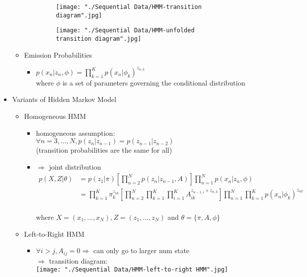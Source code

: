 \begin{itemize}
\begin{itemize}
\begin{itemize}
\begin{figure}[h]
			\centering
			\begin{minipage}{.5\textwidth}
				\texttt{[image: "./Sequential Data/HMM-transition diagram".jpg]}
			\end{minipage}%
			\begin{minipage}{.5\textwidth}
				\texttt{[image: "./Sequential Data/HMM-unfolded transition diagram".jpg]}
			\end{minipage}
		\end{figure}
		\end{itemize}
	\item Emission Probabilities
		\begin{itemize}
		\item $\displaystyle p(x_n|z_n,\phi) = \prod_{k=1}^K p(x_n|\phi_k)^{z_{n,k}}$ \\
		where $\phi$ is a set of parameters governing the conditional distribution
		\end{itemize}
	\end{itemize}
\item Variants of Hidden Markov Model
	\begin{itemize}
	\item Homogeneous HMM
		\begin{itemize}
		\item homogeneous assumption: $\forall n=3,...,N, p(z_n|z_{n-1}) = p(z_{n-1}|z_{n-2})$ \\
		(transition probabilities are the same for all)
		\item $\Rightarrow$ joint distribution \begin{align*} \displaystyle p(X,Z|\theta) &= p(z_1|\pi) \left[\prod_{n=2}^N p(z_n|z_{n-1},A)\right] \prod_{n=1}^N p(x_n|z_n,\phi) \\ &= \prod_{k=1}^K \pi_k^{z_{1k}} \left[ \prod_{n=2}^N  \prod_{k=1}^K \prod_{i=1}^K A_{ik}^{z_{n-1,i} \times z_{n,k}} \right] \prod_{n=1}^N \prod_{k=1}^Kp(x_n|\phi_k)^{z_{nk}}\end{align*} \\
		where $X = (x_1,...,x_N), Z=(z_1,...,z_N)$ and $\theta = \{\pi,A,\phi\}$
		\end{itemize}
	\item Left-to-Right HMM
		\begin{itemize}
		\item $\forall i>j,A_{ij} = 0 \Rightarrow$ can only go to larger num state \\
		$\Rightarrow$ transition diagram: \\ 
		\texttt{[image: "./Sequential Data/HMM-left-to-right HMM".jpg]}
		

\end{itemize}
\end{itemize}
\end{itemize}

